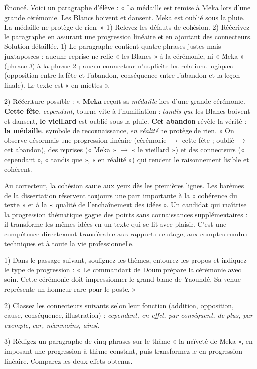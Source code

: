 \documentclass[11pt]{article}
\begin{document}
\begin{exoresolu}
Énoncé. Voici un paragraphe d'élève : « La médaille est remise à Meka lors d'une grande cérémonie. Les Blancs boivent et dansent. Meka est oublié sous la pluie. La médaille ne protège de rien. » 1) Relevez les défauts de cohésion. 2) Réécrivez le paragraphe en assurant une progression linéaire et en ajoutant des connecteurs.
\tcblower
Solution détaillée. 1) Le paragraphe contient quatre phrases justes mais juxtaposées : aucune reprise ne relie « les Blancs » à la cérémonie, ni « Meka » (phrase 3) à la phrase 2 ; aucun connecteur n'explicite les relations logiques (opposition entre la fête et l'abandon, conséquence entre l'abandon et la leçon finale). Le texte est « en miettes ».

2) Réécriture possible : « \textbf{Meka} reçoit sa \emph{médaille} lors d'une grande cérémonie. \textbf{Cette fête}, \emph{cependant}, tourne vite à l'humiliation : \emph{tandis que} les Blancs boivent et dansent, \textbf{le vieillard} est oublié sous la pluie. \textbf{Cet abandon} révèle la vérité : \textbf{la médaille}, symbole de reconnaissance, \emph{en réalité} ne protège de rien. » On observe désormais une progression linéaire (cérémonie $\rightarrow$ cette fête ; oublié $\rightarrow$ cet abandon), des reprises (« Meka » $\rightarrow$ « le vieillard ») et des connecteurs (« cependant », « tandis que », « en réalité ») qui rendent le raisonnement lisible et cohérent.
\end{exoresolu}

\begin{savaistu}
Au correcteur, la cohésion saute aux yeux dès les premières lignes. Les barèmes de la dissertation réservent toujours une part importante à la « cohérence du texte » et à la « qualité de l'enchaînement des idées ». Un candidat qui maîtrise la progression thématique gagne des points sans connaissances supplémentaires : il transforme les mêmes idées en un texte qui se lit avec plaisir. C'est une compétence directement transférable aux rapports de stage, aux comptes rendus techniques et à toute la vie professionnelle.
\end{savaistu}

\begin{exercice}
1) Dans le passage suivant, soulignez les thèmes, entourez les propos et indiquez le type de progression : « Le commandant de Doum prépare la cérémonie avec soin. Cette cérémonie doit impressionner le grand blanc de Yaoundé. Sa venue représente un honneur rare pour le poste. »

2) Classez les connecteurs suivants selon leur fonction (addition, opposition, cause, conséquence, illustration) : \emph{cependant, en effet, par conséquent, de plus, par exemple, car, néanmoins, ainsi}.

3) Rédigez un paragraphe de cinq phrases sur le thème « la naïveté de Meka », en imposant une progression à thème constant, puis transformez-le en progression linéaire. Comparez les deux effets obtenus.
\end{exercice}
\end{document}
